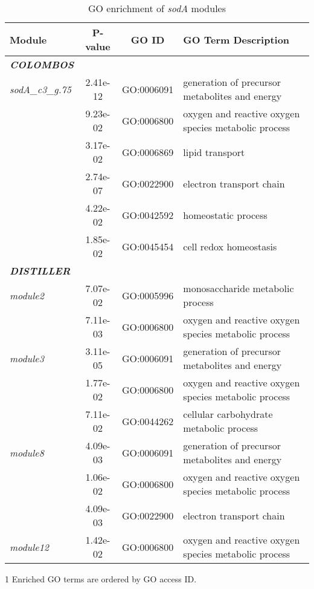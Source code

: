\begin{table}[tb]
\begin{threeparttable}
	\caption{GO enrichment of \textit{sodA} modules}
	\label{tab:GOenrich}
	\begin{small}
	\begin{tabular}{p{2.2cm} c c p{5.3cm}}
	\toprule
	{\bf Module} & {\bf P-value} & {\bf GO ID} & {\bf GO Term Description} \\
	\midrule
	{\bf\it COLOMBOS} \\
	\hline
	\textit{sodA\_c3\_g.75}	& 2.41e-12 & GO:0006091 & generation of precursor 
	metabolites and energy \\
	& 9.23e-02 & GO:0006800 & oxygen and reactive oxygen species metabolic 
		process \\
	& 3.17e-02 & GO:0006869 & lipid transport \\
	& 2.74e-07&	GO:0022900&	electron transport chain \\
	& 4.22e-02&	GO:0042592&	homeostatic process \\	
	& 1.85e-02&	GO:0045454&	cell redox homeostasis \\[2ex]
	{\bf\it DISTILLER} \\
	\hline
	\textit{module2} & 7.07e-02&	GO:0005996&	monosaccharide metabolic 
	process \\
	& 7.11e-03&	GO:0006800&	oxygen and reactive oxygen species metabolic 
		process \\
	\hline
	\textit{module3} & 3.11e-05&	GO:0006091& generation of precursor 
	metabolites 
	and energy \\
	& 1.77e-02&	GO:0006800&	oxygen and reactive oxygen species metabolic 
	process \\
	& 7.11e-02&	GO:0044262&	cellular carbohydrate metabolic process \\
	\hline
	\textit{module8} & 4.09e-03&	GO:0006091&	generation of precursor 
	metabolites 
	and energy \\
	& 1.06e-02&	GO:0006800&	oxygen and reactive oxygen species metabolic 
	process \\
	& 4.09e-03&	GO:0022900&	electron transport chain \\
	\hline
	\textit{module12}& 1.42e-02& GO:0006800& oxygen and reactive oxygen 
	species metabolic process \\
	\bottomrule
	\end{tabular}
	\begin{tablenotes}
	\item[1] Enriched GO terms are ordered by GO access ID.
	\end{tablenotes}
	\end{small}
\end{threeparttable}
\end{table}


